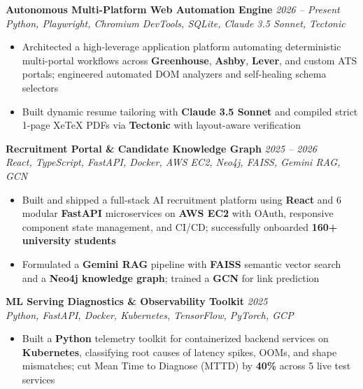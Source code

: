 \documentclass[10pt]{article}
\begin{document}
\textbf{Autonomous Multi-Platform Web Automation Engine} \hfill \href{https://github.com/username/project}{\faGithub} \textcolor{subheadingcolor}{\textit{2026 -- Present}} \\
\textit{Python, Playwright, Chromium DevTools, SQLite, Claude 3.5 Sonnet, Tectonic}
\begin{itemize}
    \item Architected a high-leverage application platform automating deterministic multi-portal workflows across \textbf{Greenhouse}, \textbf{Ashby}, \textbf{Lever}, and custom ATS portals; engineered automated DOM analyzers and self-healing schema selectors
    \item Built dynamic resume tailoring with \textbf{Claude 3.5 Sonnet} and compiled strict 1-page XeTeX PDFs via \textbf{Tectonic} with layout-aware verification
\end{itemize}
\vspace{-0.25em}

\textbf{Recruitment Portal \& Candidate Knowledge Graph} \hfill \href{https://github.com/username/portal}{\faGithub} \textcolor{subheadingcolor}{\textit{2025 -- 2026}} \\
\textit{React, TypeScript, FastAPI, Docker, AWS EC2, Neo4j, FAISS, Gemini RAG, GCN}
\begin{itemize}
    \item Built and shipped a full-stack AI recruitment platform using \textbf{React} and 6 modular \textbf{FastAPI} microservices on \textbf{AWS EC2} with OAuth, responsive component state management, and CI/CD; successfully onboarded \textbf{160+ university students}
    \item Formulated a \textbf{Gemini RAG} pipeline with \textbf{FAISS} semantic vector search and a \textbf{Neo4j knowledge graph}; trained a \textbf{GCN} for link prediction
\end{itemize}
\vspace{-0.25em}

\textbf{ML Serving Diagnostics \& Observability Toolkit} \hfill \href{https://github.com/username/ml-monitoring}{\faGithub} \textcolor{subheadingcolor}{\textit{2025}} \\
\textit{Python, FastAPI, Docker, Kubernetes, TensorFlow, PyTorch, GCP}
\begin{itemize}
    \item Built a \textbf{Python} telemetry toolkit for containerized backend services on \textbf{Kubernetes}, classifying root causes of latency spikes, OOMs, and shape mismatches; cut Mean Time to Diagnose (MTTD) by \textbf{40\%} across 5 live test services
\end{itemize}
\vspace{-0.45em}
\end{document}
